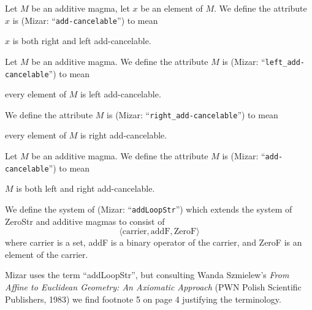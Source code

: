 \documentclass{article}
\begin{document}
\begin{definition}
Let $M$ be an additive magma, let $x$ be an element of $M$. We define
the attribute $x$ is  (Mizar: ``\verb#add-cancelable#'')
to mean
\begin{defn}%
\item $x$ is both right and left add-cancelable.
\end{defn}
\end{definition}

\begin{definition}
Let $M$ be an additive magma.
We define the attribute $M$ is  (Mizar:
``\verb#left_add-cancelable#'') to mean
\begin{defn}%
\item every element of $M$ is left add-cancelable.
\end{defn}
We define the attribute $M$ is  (Mizar:
``\verb#right_add-cancelable#'') to mean
\begin{defn}%
\item every element of $M$ is right add-cancelable.
\end{defn}
\end{definition}

\begin{definition}
Let $M$ be an additive magma.
We define the attribute $M$ is  (Mizar:
``\verb#add-cancelable#'') to mean
\begin{defn}%
\item $M$ is both left and right add-cancelable.
\end{defn}
\end{definition}

\begin{definition}%
We define the system of  (Mizar: ``\verb#addLoopStr#'') which extends
the system of ZeroStr and additive magmas to consist of
\[\langle\mbox{carrier},\mbox{addF},\mbox{ZeroF}\rangle\]
where carrier is a set, addF is a binary operator of the carrier, and
ZeroF is an element of the carrier.
\end{definition}

\begin{remark}
Mizar uses the term ``addLoopStr'', but consulting Wanda Szmielew's
\textit{From Affine to Euclidean Geometry: An Axiomatic Approach} (PWN
Polish Scientific Publishers, 1983) we find footnote 5 on page 4
justifying the terminology.
\end{remark}
\end{document}
